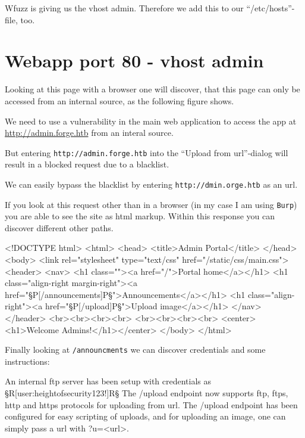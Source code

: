 Wfuzz is giving us the vhost admin. Therefore we add this to our \enquote{/etc/hosts}-file, too.

\section{Webapp port 80 - vhost admin}
Looking at this page with a browser one will discover, that this page can only be accessed from an internal source, as the following figure shows.


We need to use a vulnerability in the main web application to access the app at \url{http://admin.forge.htb} from an interal source.

But entering \texttt{http://admin.forge.htb} into the \enquote{Upload from url}-dialog will result in a blocked request due to a blacklist.


We can easily bypass the blacklist by entering \texttt{http://dmin.orge.htb} as an url.

If you look at this request other than in a browser (in my case I am using \texttt{Burp}) you are able to see the site as html markup. Within this response you can discover different other paths.

\begin{wulisting}[caption=paths leaking]
<!DOCTYPE html>
<html>
<head>
	<title>Admin Portal</title>
</head>
<body>
	<link rel="stylesheet" type="text/css" href="/static/css/main.css">
	<header>
		<nav>
		<h1 class=""><a href="/">Portal home</a></h1>
		<h1 class="align-right margin-right"><a href="§P[/announcements]P§">Announcements</a></h1>
		<h1 class="align-right"><a href="§P[/upload]P§">Upload image</a></h1>
		</nav>
	</header>
	<br><br><br><br>
	<br><br><br><br>
	<center><h1>Welcome Admins!</h1></center>
</body>
</html>
\end{wulisting}

Finally looking at \texttt{/announcments} we can discover credentials and some instructions:

\begin{wulisting}[caption=credentials and announcment]
An internal ftp server has been setup with credentials as §R[user:heightofsecurity123!]R§
The /upload endpoint now supports ftp, ftps, http and https protocols for uploading from url.
The /upload endpoint has been configured for easy scripting of uploads, and for uploading an image, one can simply pass a url with ?u=<url>.
\end{wulisting}

